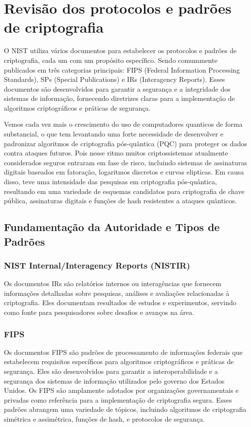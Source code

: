\chapter{Revisão dos protocolos e padrões de criptografia}
    O NIST utiliza vários documentos para estabelecer os protocolos e padrões de criptografia, cada um com um propósito específico. Sendo comummente publicados em três categorias principais: FIPS (Federal Information Processing Standards), SPs (Special Publications) e IRs (Interagency Reports). Esses documentos são desenvolvidos para garantir a segurança e a integridade dos sistemas de informação, fornecendo diretrizes claras para a implementação de algoritmos criptográficos e práticas de segurança.

    Vemos cada vez mais o crescimento do uso de computadores quanticos de forma substancial, o que tem levantando uma forte necessidade de desenvolver e padronizar algoritmos de criptografia pós-quântica (PQC) para proteger os dados contra ataques futuros. Pois nesse ritmo muitos criptossistemas atualmente considerados seguros entraram em fase de risco, incluindo sistemas de assinaturas digitais baseados em fatoração, logaritmos discretos e curvas elipticas\cite{nistIR8413}. Em causa disso, teve uma intensidade das pesquisas em criptografia pós-quântica, resultando em uma variedade de esquemas candidatos para criptografia de chave pública, assinaturas digitais e funções de hash resistentes a ataques quânticos\cite{nistIR8413}.

    \section{Fundamentação da Autoridade e Tipos de Padrões}

    \subsection{NIST Internal/Interagency Reports (NISTIR)}
        Os documentos IRs são relatórios internos ou interagências que fornecem informações detalhadas sobre pesquisas, análises e avaliações relacionadas à criptografia\cite{nistIR7977}. Eles documentam resultados de estudos e experimentos, servindo como fonte para pesquisadores sobre desafios e avanços na área\cite{nistIR7977}.

    \subsection{FIPS}
        Os documentos FIPS são padrões de processamento de informações federais que estabelecem requisitos específicos para algoritmos criptográficos e práticas de segurança\cite{nistIR7977}. Eles são desenvolvidos para garantir a interoperabilidade e a segurança dos sistemas de informação utilizados pelo governo dos Estados Unidos\cite{nistIR7977}. Os FIPS são amplamente adotados por organizações governamentais e privadas como referência para a implementação de criptografia segura\cite{nistIR7977}. Esses padrões abrangem uma variedade de tópicos, incluindo algoritmos de criptografia simétrica e assimétrica, funções de hash, e protocolos de segurança\cite{nistIR7977}.

